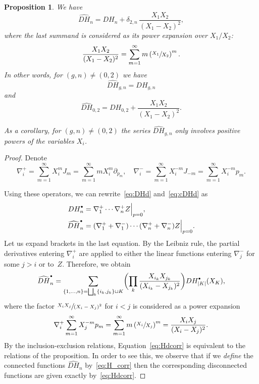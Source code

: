 \documentclass[JEP,XML,SOM,Unicode,NoEqCountersInSection,NoFloatCountersInSection]{cedram}
\newcommand{\sbullet}{{\scriptscriptstyle\bullet}}
\newcommand{\csbullet}{{\raisebox{1pt}{$\sbullet$}}}
\theoremstyle{plain}
\newtheorem{proposition}[theorem]{Proposition}
\theoremstyle{definition}
\theoremstyle{remark}
\newcommand{\Hd}{H^\csbullet}
\begin{document}
\begin{proposition}\label{prop:H_corr}
We have
\begin{equation}\label{eq:H_corr}
\widehat{DH}_n=DH_n+\delta_{2,n}\,\frac{X_1X_2}{(X_1-X_2)^2},
\end{equation}
where the last summand is considered as its power expansion over $X_1/X_2$:
\begin{equation*}
\frac{X_1X_2}{(X_1-X_2)^2}=\sum_{m=1}^\infty m\left(\sfrac{X_1}{X_2}\right)^m.
\end{equation*}
In other words, for $(g,n)\ne(0,2)$ we have
\begin{equation*}
\widehat{D H}_{g,n}=DH_{g,n}
\end{equation*}
and
\begin{equation}\label{eq:DH02}
\widehat{D H}_{0,2}=DH_{0,2}+\frac{X_1X_2}{(X_1-X_2)^2}.
\end{equation}

As a corollary, for $(g,n)\ne(0,2)$ the series $\widehat{D H}_{g,n}$ only involves positive powers of the variables $X_i$.
\end{proposition}

\begin{proof}
Denote
\begin{equation*}
\nabla^+_i=\sum_{m=1}^\infty X_i^m J_m=\sum_{m=1}^\infty m X_i^m \partial_{p_m},\quad
\nabla^-_i=\sum_{m=1}^\infty X_i^{-m} J_{-m}=\sum_{m=1}^\infty X_i^{-m} p_m.
\end{equation*}

Using these operators, we can rewrite~\eqref{eq:DHd} and~\eqref{eq:cDHd} as
\begin{align*}
D\Hd_n&=
\nabla_1^+\cdots \nabla_n^+Z\Big|_{p=0},\\
\widehat{DH}^\csbullet_n&=
(\nabla_1^++\nabla_1^-)\cdots (\nabla_n^++\nabla_n^-)Z\Big|_{p=0}.
\end{align*}
Let us expand brackets in the last equation. By the Leibniz rule, the partial derivatives entering $\nabla_i^+$ are applied to either the linear functions entering $\nabla_j^-$ for some $j>i$ or to~$Z$. Therefore, we obtain
\begin{equation}\label{eq:Hdcorr}
\widehat{DH}^\csbullet_n=
\sum_{\{1,\dots,n\}=\bigsqcup_k\{i_k,j_k\}\sqcup K}\biggl(\prod_k\frac{X_{i_k}X_{j_k}}{(X_{i_k}-X_{j_k})^2}\biggr)D\Hd_{|K|}(X_K),
\end{equation}
where the factor $\sfrac{X_iX_j}{(X_i-X_j)^2}$ for $i<j$ is considered as a power expansion
\begin{equation*}
\nabla^+_i\sum_{m=1}^\infty X_j^{-m} p_m
=\sum_{m=1}^\infty m\left(\sfrac{X_i}{X_j}\right)^m
=\frac{X_iX_j}{(X_i-X_j)^2}.
\end{equation*}
By the inclusion-exclusion relations, Equation~\eqref{eq:Hdcorr} is equivalent to the relations of the proposition. In order to see this, we observe that if we \emph{define} the connected functions $\widehat{DH}_n$ by~\eqref{eq:H_corr}
then the corresponding disconnected functions are given exactly by~\eqref{eq:Hdcorr}.
\end{proof}
\end{document}
